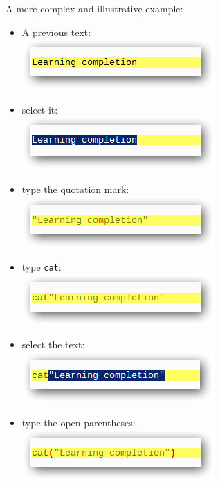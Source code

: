 A more complex and illustrative example:
\begin{itemize}
  \item A previous text: \\
    \includegraphics[scale=0.50]{./res/completion_howto_04.png}
  \item select it: \\
    \includegraphics[scale=0.50]{./res/completion_howto_05.png}
  \item type the quotation mark: \\
    \includegraphics[scale=0.50]{./res/completion_howto_06.png}
  \item type \texttt{cat}: \\
    \includegraphics[scale=0.50]{./res/completion_howto_07.png}
  \item select the text: \\
    \includegraphics[scale=0.50]{./res/completion_howto_08.png}
  \item type the open parentheses: \\
    \includegraphics[scale=0.50]{./res/completion_howto_09.png}
\end{itemize}
